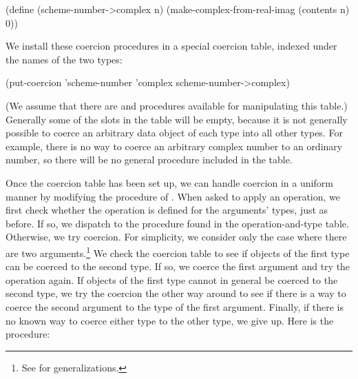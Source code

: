 \begin{codeBlock}
(define (scheme-number->complex n)
  (make-complex-from-real-imag (contents n) 0))
\end{codeBlock}

\noindent
We install these coercion procedures in a special coercion table, indexed under
the names of the two types:

\begin{codeBlock}
(put-coercion 'scheme-number
              'complex
              scheme-number->complex)
\end{codeBlock}

\noindent
(We assume that there are  and 
procedures available for manipulating this table.)  Generally some of the slots
in the table will be empty, because it is not generally possible to coerce an
arbitrary data object of each type into all other types.  For example, there is
no way to coerce an arbitrary complex number to an ordinary number, so there
will be no general  procedure included in the
table.

Once the coercion table has been set up, we can handle coercion in a uniform
manner by modifying the  procedure of .
When asked to apply an operation, we first check whether the operation is
defined for the arguments' types, just as before.  If so, we dispatch to the
procedure found in the operation-and-type table.  Otherwise, we try coercion.
For simplicity, we consider only the case where there are two
arguments.\footnote{See  for generalizations.}  We check the
coercion table to see if objects of the first type can be coerced to the second
type.  If so, we coerce the first argument and try the operation again.  If
objects of the first type cannot in general be coerced to the second type, we
try the coercion the other way around to see if there is a way to coerce the
second argument to the type of the first argument.  Finally, if there is no
known way to coerce either type to the other type, we give up.  Here is the
procedure:

